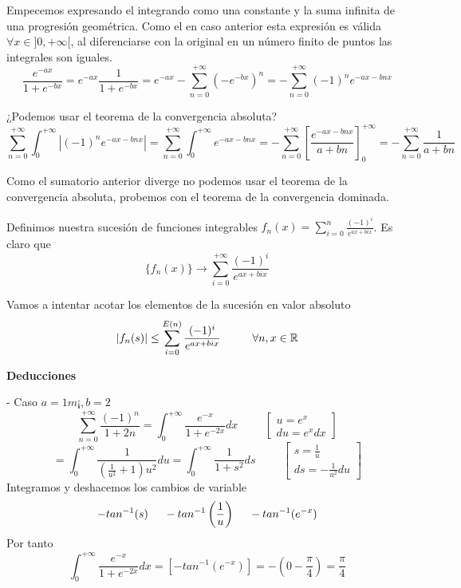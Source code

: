 Empecemos expresando el integrando como una constante y la suma infinita de una progresión geométrica.
Como el en caso anterior esta expresión es válida $\forall x\in ]0, +\infty[$, al diferenciarse con
la original en un número finito de puntos las integrales son iguales.
\[ \frac{e^{-ax}}{1+e^{-bx}}
 = e^{-ax}\frac{1}{1+e^{-bx}}
 = e^{-ax} -\sum_{n=0}^{+\infty} (-e^{-bx})^n
 = -\sum_{n=0}^{+\infty} (-1)^n e^{-ax-bnx}
\]

¿Podemos usar el teorema de la convergencia absoluta?
\[ \sum_{n=0}^{+\infty} \int_0^{+\infty} | (-1)^ne^{-ax-bnx} |
 = \sum_{n=0}^{+\infty} \int_0^{+\infty} e^{-ax-bnx}
 = -\sum_{n=0}^{+\infty} \left[ \frac{e^{-ax-bnx}}{a+bn} \right]_0^{+\infty} 
 = -\sum_{n=0}^{+\infty} \frac{1}{a+bn}
\]

Como el sumatorio anterior diverge no podemos usar el teorema de la convergencia absoluta, probemos
con el teorema de la convergencia dominada.

Definimos nuestra sucesión de funciones integrables $f_n(x) = \sum_{i=0}^{n} \frac{(-1)^i}{e^{ax+bix}}$.
Es claro que
\[ \{f_n(x)\} \to \sum_{i=0}^{+\infty} \frac{(-1)^i}{e^{ax+bix}}
\]



Vamos a intentar acotar los elementos de la sucesión en valor absoluto
\[ |f_n(s)| \leq \sum_{i=0}^{E(n)} \frac{(-1)^i}{e^{ax+bix}} \hspace{1cm} \forall n,x\in\mathbb{R}
\]







\textbf{Deducciones}

- Caso $a=1m¡,b=2$
\[ \sum_{n=0}^{+\infty} \frac{(-1)^n}{1+2n}
 = \int_0^{+\infty} \frac{e^{-x}}{1+e^{-2x}}dx \hspace{1cm}
	\begin{bmatrix}
	u  = e^x  \\
	du = e^x dx
	\end{bmatrix}
\]
\[ = \int_0^{+\infty} \frac{1}{\left( \frac{1}{u^2} +1 \right) u^2}du 
   = \int_0^{+\infty} \frac{1}{1+s^2} ds
    \hspace{1cm}
	\begin{bmatrix}
	s  = \frac{1}{u} \\
	ds = -\frac{1}{u^2}du	
	\end{bmatrix}
\]
Integramos y deshacemos los cambios de variable
\[ -tan^{-1}(s) \hspace{0.5cm} -tan^{-1}\left( \frac{1}{u}\right) \hspace{0.5cm}
   -tan^{-1} (e^{-x})
\]
Por tanto
\[ \int_0^{+\infty} \frac{e^{-x}}{1+e^{-2x}}dx
 = \left[ -tan^{-1} (e^{-x}) \right]
 = -(0-\frac{\pi}{4}) = 	\frac{\pi}{4}
\]


